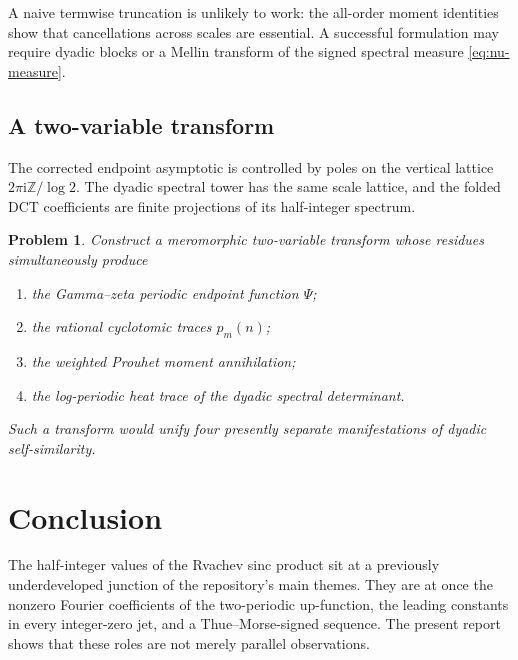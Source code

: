 \documentclass[11pt,oneside]{article}
\newtheorem{problem}[theorem]{Problem}
\theoremstyle{definition}
\theoremstyle{remark}
\newcommand{\Z}{\mathbb Z}
\newcommand{\ii}{\mathrm i}
\begin{document}
A naive termwise truncation is unlikely to work: the all-order moment identities
show that cancellations across scales are essential.  A successful formulation
may require dyadic blocks or a Mellin transform of the signed spectral measure
\eqref{eq:nu-measure}.

\subsection{A two-variable transform}

The corrected endpoint asymptotic is controlled by poles on the vertical
lattice $2\pi\ii\Z/\log2$.  The dyadic spectral tower has the same scale lattice,
and the folded DCT coefficients are finite projections of its half-integer
spectrum.

\begin{problem}\label{prob:two-variable-transform}
Construct a meromorphic two-variable transform whose residues simultaneously
produce
\begin{enumerate}
 \item the Gamma--zeta periodic endpoint function $\Psi$;
 \item the rational cyclotomic traces $p_m(n)$;
 \item the weighted Prouhet moment annihilation;
 \item the log-periodic heat trace of the dyadic spectral determinant.
\end{enumerate}
Such a transform would unify four presently separate manifestations of dyadic
self-similarity.
\end{problem}

\section{Conclusion}\label{sec:conclusion}

The half-integer values of the Rvachev sinc product sit at a previously
underdeveloped junction of the repository's main themes.  They are at once the
nonzero Fourier coefficients of the two-periodic up-function, the leading
constants in every integer-zero jet, and a Thue--Morse-signed sequence.  The
present report shows that these roles are not merely parallel observations.
\end{document}
